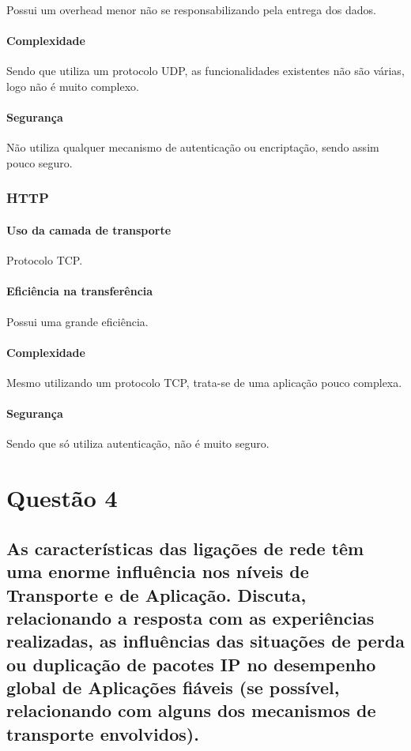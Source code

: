 \documentclass[a4paper]{report}
\begin{document}
Possui um overhead menor não se responsabilizando pela entrega dos dados.

\subsubsection{Complexidade}

Sendo que utiliza um protocolo UDP, as funcionalidades existentes não são várias, logo não é muito complexo.

\subsubsection{Segurança}

Não utiliza qualquer mecanismo de autenticação ou encriptação, sendo assim pouco seguro.

\subsection{HTTP}

\subsubsection{Uso da camada de transporte}

Protocolo TCP.

\subsubsection{Eficiência na transferência}

Possui uma grande eficiência.

\subsubsection{Complexidade}

Mesmo utilizando um protocolo TCP, trata-se de uma aplicação pouco complexa.

\subsubsection{Segurança}

Sendo que só utiliza autenticação, não é muito seguro.

\chapter{Questão 4}

\section{As características das ligações de rede têm uma enorme influência nos níveis de Transporte e de Aplicação. Discuta,
relacionando a resposta com as experiências realizadas, as influências das situações de perda ou duplicação de pacotes IP no
desempenho global de Aplicações fiáveis (se possível, relacionando com alguns dos mecanismos de transporte envolvidos).}
\end{document}
